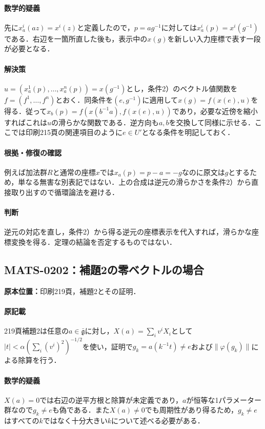 \documentclass[a4paper,10pt]{ltjsarticle}
\begin{document}
\paragraph{数学的疑義}先に$x_a^i(az)=x^i(z)$と定義したので，$p=ag^{-1}$に対しては$x_a^i(p)=x^i(g^{-1})$である．右辺を一箇所直した後も，表示中の$x(g)$を新しい入力座標で表す一段が必要となる．

\paragraph{解決策}$u=(x_a^1(p),\ldots,x_a^n(p))=x(g^{-1})$とし，条件2）のベクトル値関数を$f=(f^1,\ldots,f^n)$とおく．同条件を$(e,g^{-1})$に適用して$x(g)=f(x(e),u)$を得る．従って$x_b(p)=f(x(b^{-1}a),f(x(e),u))$であり，必要な近傍を縮小すればこれは$u$の滑らかな関数である．逆方向も$a,b$を交換して同様に示せる．ここでは印刷215頁の関連項目のように$e\in U′$となる条件を明記しておく．

\paragraph{根拠・修復の確認}例えば加法群$R$と通常の座標$x$では$x_a(p)=p-a=-g$なのに原文は$g$とするため，単なる無害な別表記ではない．上の合成は逆元の滑らかさを条件2）から直接取り出すので循環論法を避ける．

\paragraph{判断}逆元の対応を直し，条件2）から得る逆元の座標表示を代入すれば，滑らかな座標変換を得る．定理の結論を否定するものではない．


\subsection*{MATS-0202：補題2の零ベクトルの場合}\label{math:MATS-0202}
\noindent\textbf{原本位置：}印刷219頁，補題2とその証明．

\paragraph{原記載}219頁補題2は任意の$a\in\bar{\mathfrak g}$に対し，$X(a)=\sum_i v^iX_i$として$|t|<\alpha(\sum_i(v^i)^2)^{-1/2}$を使い，証明で$g_k=a(k^{-1}t)\ne e$および$\|\varphi(g_k)\|$による除算を行う．

\paragraph{数学的疑義}$X(a)=0$では右辺の逆平方根と除算が未定義であり，$a$が恒等な1パラメーター群なので$g_k\ne e$も偽である．また$X(a)\ne0$でも周期性があり得るため，$g_k\ne e$はすべての$k$ではなく十分大きい$k$について述べる必要がある．
\end{document}
